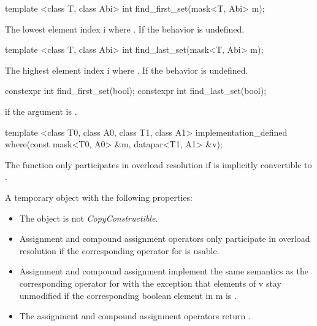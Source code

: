 \begin{itemdecl}
template <class T, class Abi> int find_first_set(mask<T, Abi> m);
\end{itemdecl}
\begin{itemdescr}
  \pnum\returns The lowest element index \code i where .
  \pnum\remarks If  the behavior is undefined.
\end{itemdescr}

\begin{itemdecl}
template <class T, class Abi> int find_last_set(mask<T, Abi> m);
\end{itemdecl}
\begin{itemdescr}
  \pnum\returns The highest element index \code i where .
  \pnum\remarks If  the behavior is undefined.
\end{itemdescr}

\begin{itemdecl}
constexpr int find_first_set(bool);
constexpr int find_last_set(bool);
\end{itemdecl}
\begin{itemdescr}
  \pnum{} if the argument is \true.
\end{itemdescr}

\begin{itemdecl}
template <class T0, class A0, class T1, class A1>
implementation_defined where(const mask<T0, A0> &m, datapar<T1, A1> &v);
\end{itemdecl}
\begin{itemdescr}
  \pnum\remarks The function only participates in overload resolution if \mask[<T0, A0>] is implicitly convertible to \mask[<T1, A1>].

  \pnum\returns A temporary object with the following properties:
  \begin{itemize}
    \item The object is not \textit{CopyConstructible}.
    \item Assignment and compound assignment operators only participate in overload resolution if the corresponding operator for \datapar[<T1, A1>] is usable.
    \item \effects Assignment and compound assignment implement the same semantics as the corresponding operator for \datapar[<T1, A1>] with the exception that elements of \code v stay unmodified if the corresponding boolean element in \code m is \false.
    \item The assignment and compound assignment operators return \void.
  \end{itemize}
\end{itemdescr}

